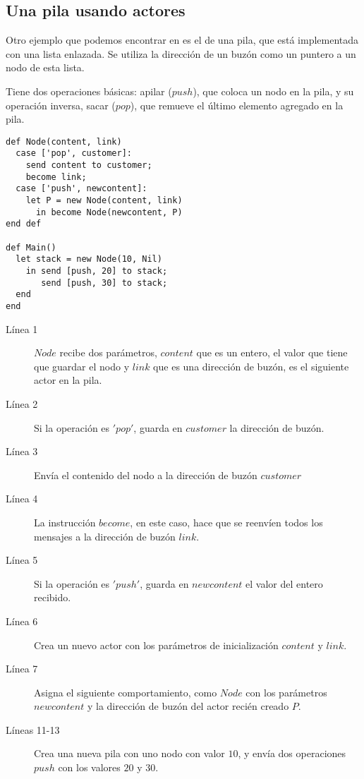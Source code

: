 \subsection{Una pila usando actores}\label{sal:pila}

Otro ejemplo que podemos encontrar en \cite{Agha:1986:AMC:7929} es el de una pila, que está implementada con una lista enlazada. Se utiliza la dirección de un buzón como un puntero a un nodo de esta lista. 

Tiene dos operaciones básicas: apilar ($push$), que coloca un nodo en la pila, y su operación inversa, sacar ($pop$), que remueve el último elemento agregado en la pila.

\begin{lstlisting}[language=sal, style=simple]
def Node(content, link)
  case ['pop', customer]:
    send content to customer;
    become link;
  case ['push', newcontent]:
    let P = new Node(content, link)
      in become Node(newcontent, P)
end def

def Main() 
  let stack = new Node(10, Nil)
    in send [push, 20] to stack;
       send [push, 30] to stack;
  end
end
\end{lstlisting}

\begin{description}

\item [Línea 1] $Node$ recibe dos parámetros, $content$ que es un entero, el valor que tiene que guardar el nodo y  $link$ que es una dirección de buzón, es el siguiente actor en la pila.
\item [Línea 2] Si la operación es $'pop'$, guarda en $customer$ la dirección de buzón.
\item [Línea 3] Envía el contenido del nodo a la dirección de buzón $customer$
\item [Línea 4] La instrucción $become$, en este caso, hace que se reenvíen todos los mensajes a la dirección de buzón $link$. 
\item [Línea 5] Si la operación es $'push'$, guarda en $newcontent$ el valor del entero recibido.
\item [Línea 6] Crea un nuevo actor con los parámetros de inicialización $content$ y $link$.
\item [Línea 7] Asigna el siguiente comportamiento, como $Node$ con los parámetros $newcontent$ y la dirección de buzón del actor recién creado $P$. 
\item [Líneas 11-13] Crea una nueva pila con uno nodo con valor $10$, y envía dos operaciones $push$ con los valores $20$ y $30$.
\end{description}

